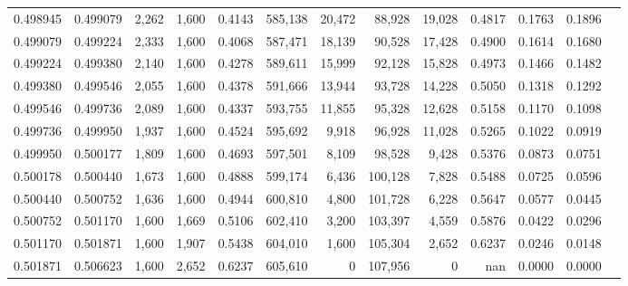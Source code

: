 \begin{tabular}{rrrrrrrrrrrrr}
0.498945 & 0.499079 &  2,262 & 1,600 &                                     0.4143 & 585,138 &  20,472 &  88,928 &  19,028 & 0.4817 & 0.1763 & 0.1896 \\
0.499079 & 0.499224 &  2,333 & 1,600 &                                     0.4068 & 587,471 &  18,139 &  90,528 &  17,428 & 0.4900 & 0.1614 & 0.1680 \\
0.499224 & 0.499380 &  2,140 & 1,600 &                                     0.4278 & 589,611 &  15,999 &  92,128 &  15,828 & 0.4973 & 0.1466 & 0.1482 \\
0.499380 & 0.499546 &  2,055 & 1,600 &                                     0.4378 & 591,666 &  13,944 &  93,728 &  14,228 & 0.5050 & 0.1318 & 0.1292 \\
0.499546 & 0.499736 &  2,089 & 1,600 &                                     0.4337 & 593,755 &  11,855 &  95,328 &  12,628 & 0.5158 & 0.1170 & 0.1098 \\
0.499736 & 0.499950 &  1,937 & 1,600 &                                     0.4524 & 595,692 &   9,918 &  96,928 &  11,028 & 0.5265 & 0.1022 & 0.0919 \\
0.499950 & 0.500177 &  1,809 & 1,600 &                                     0.4693 & 597,501 &   8,109 &  98,528 &   9,428 & 0.5376 & 0.0873 & 0.0751 \\
0.500178 & 0.500440 &  1,673 & 1,600 &                                     0.4888 & 599,174 &   6,436 & 100,128 &   7,828 & 0.5488 & 0.0725 & 0.0596 \\
0.500440 & 0.500752 &  1,636 & 1,600 &                                     0.4944 & 600,810 &   4,800 & 101,728 &   6,228 & 0.5647 & 0.0577 & 0.0445 \\
0.500752 & 0.501170 &  1,600 & 1,669 &                                     0.5106 & 602,410 &   3,200 & 103,397 &   4,559 & 0.5876 & 0.0422 & 0.0296 \\
0.501170 & 0.501871 &  1,600 & 1,907 &                                     0.5438 & 604,010 &   1,600 & 105,304 &   2,652 & 0.6237 & 0.0246 & 0.0148 \\
0.501871 & 0.506623 &  1,600 & 2,652 &                                     0.6237 & 605,610 &       0 & 107,956 &       0 &    nan & 0.0000 & 0.0000 \\
\bottomrule
\end{tabular}
